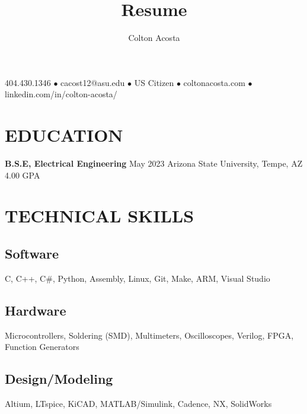 \documentclass{article}
\makeatletter
\renewcommand{\maketitle}{
	\begin{center}
		{\huge\bfseries
			\theauthor}
			
		404.430.1346 $\bullet$ cacost12@asu.edu $\bullet$ US Citizen $\bullet$ coltonacosta.com $\bullet$ linkedin.com/in/colton-acosta/
	\end{center}
}
\makeatother
\begin{document}
\title{Resume}
\author{Colton Acosta}
\maketitle
\section{EDUCATION}
\textbf{B.S.E, Electrical Engineering}
\hfill 
May 2023
\linebreak
Arizona State University, Tempe, AZ 
\hfill
4.00 GPA

\section{TECHNICAL SKILLS}
\subsection{Software} 
C, C++, C\#, Python, Assembly, Linux, Git, Make, ARM, Visual Studio 
\subsection{Hardware}
Microcontrollers, Soldering (SMD), Multimeters, Oscilloscopes, Verilog, FPGA, Function Generators 
\subsection{Design/Modeling}
Altium, LTspice, KiCAD, MATLAB/Simulink, Cadence, NX, SolidWorks 
\end{document}
